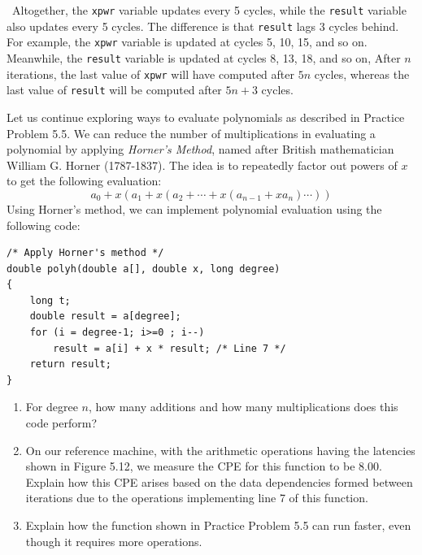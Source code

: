 \documentclass[12pt]{article}
\newenvironment{ex}[2][Exercise]{\begin{trivlist}
		\item[\hskip \labelsep {\bfseries #1}\hskip \labelsep {\bfseries #2.}]}{\end{trivlist}}
\newenvironment{sol}[1][Solution]{\begin{trivlist}
		\item[\hskip \labelsep {\bfseries #1:}]}{\end{trivlist}}
\begin{document}
\begin{sol}
\begin{enumerate}[label=(\alph*)]
		\
		Altogether, the \texttt{xpwr} variable updates every 5 cycles, while the \texttt{result}
		variable also updates every 5 cycles. The difference is that \texttt{result} lags 3
		cycles behind. For example, the \texttt{xpwr} variable is updated at cycles 5, 10, 15,
		and so on. Meanwhile, the \texttt{result} variable is updated at cycles 8, 13, 18, and
		so on, After $n$ iterations, the last value of \texttt{xpwr} will have computed after
		$5n$ cycles, whereas the last value of \texttt{result} will be computed after $5n+3$
		cycles. 
		
	\end{enumerate}
\end{sol}

\begin{ex}{5.6}
	Let us continue exploring ways to evaluate polynomials as described in Practice Problem 5.5.
	We can reduce the number of multiplications in evaluating a polynomial by applying
	\emph{Horner's Method}, named after British mathematician William G. Horner (1787-1837).
	The idea is to repeatedly factor out powers of $x$ to get the following evaluation:
	\[
	a_0+x(a_1+x(a_2+\cdots+x(a_{n-1}+xa_n)\cdots))
	\]
	Using Horner's method, we can implement polynomial evaluation using the following code:
	\begin{lstlisting}
/* Apply Horner's method */
double polyh(double a[], double x, long degree)
{
	long t;
	double result = a[degree];
	for (i = degree-1; i>=0 ; i--)
		result = a[i] + x * result;	/* Line 7 */
	return result;
}
	\end{lstlisting}
	\begin{enumerate}[label=(\alph*)]
		\item For degree $n$, how many additions and how many multiplications does this code
		perform?
		\item On our reference machine, with the arithmetic operations having the latencies
		shown in Figure 5.12, we measure the CPE for this function to be 8.00. Explain how
		this CPE arises based on the data dependencies formed between iterations due to the
		operations implementing line 7 of this function.
		\item Explain how the function shown in Practice Problem 5.5 can run faster, even though
		it requires more operations.
	\end{enumerate}
\end{ex}
\end{document}
